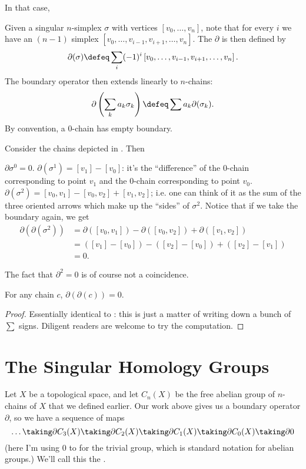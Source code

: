 In that case,
\begin{definition}
	Given a singular $n$-simplex $\sigma$ with vertices $[v_0, \dots, v_n]$,
	note that for every $i$ we have an $(n-1)$ simplex $[v_0, \dots, v_{i-1}, v_{i+1}, \dots, v_n]$.
	The  $\partial$ is then defined by
	\[ \partial(\sigma) \defeq \sum_i (-1)^i
		\left[ v_0, \dots, v_{i-1}, v_{i+1}, \dots, v_n \right]. \]
	The boundary operator then extends linearly to $n$-chains:
	\[ \partial\left( \sum_k a_k \sigma_k \right) \defeq \sum a_k \partial(\sigma_k). \]
	By convention, a $0$-chain has empty boundary.
\end{definition}
\begin{example}
	Consider the chains depicted in . Then
	\begin{enumerate}[(a)]
		\ii $\partial\sigma^0 = 0$.
		\ii $\partial(\sigma^1) = [v_1] - [v_0]$:
		it's the ``difference'' of the $0$-chain corresponding to point $v_1$
		and the $0$-chain corresponding to point $v_0$.
		\ii $\partial(\sigma^2) = [v_0,v_1] - [v_0,v_2] + [v_1, v_2]$;
		i.e. one can think of it as the sum of the three oriented arrows
		which make up the ``sides'' of $\sigma^2$.
		\ii Notice that if we take the boundary again, we get
		\begin{align*}
			\partial(\partial(\sigma^2))
			&= \partial([v_0,v_1]) - \partial([v_0,v_2]) + \partial([v_1,v_2]) \\
			&= \left( [v_1]-[v_0] \right) - \left( [v_2]-[v_0] \right) + \left( [v_2]-[v_1] \right)  \\
			&= 0.
		\end{align*}
	\end{enumerate}
\end{example}

The fact that $\partial^2 = 0$ is of course not a coincidence.
\begin{theorem}
	[$\partial^2=0$]
	For any chain $c$, $\partial(\partial(c)) = 0$.
\end{theorem}
\begin{proof}
	Essentially identical to :
	this is just a matter of writing down a bunch of $\sum$ signs.
	Diligent readers are welcome to try the computation.
\end{proof}

\section{The Singular Homology Groups}
Let $X$ be a topological space, and let $C_n(X)$ be the free abelian group
of $n$-chains of $X$ that we defined earlier.
Our work above gives us a boundary operator $\partial$, so we have a sequence of maps
\[ \dots \taking\partial C_3(X) \taking\partial C_2(X)
	\taking\partial C_1(X) \taking\partial C_0(X) \taking\partial 0 \]
(here I'm using $0$ to for the trivial group, which is standard notation for abelian groups.)
We'll call this the .

